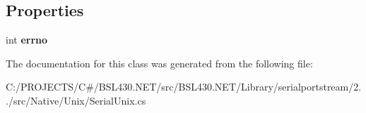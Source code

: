 \subsection*{Properties}
\begin{DoxyCompactItemize}
\item 
\mbox{\label{class_r_j_c_p_1_1_i_o_1_1_ports_1_1_native_1_1_unix_1_1_serial_unix_a579af7009aa1f1f31082a5bf8baaffbb}} 
int {\bfseries errno}
\end{DoxyCompactItemize}


The documentation for this class was generated from the following file\+:\begin{DoxyCompactItemize}
\item 
C\+:/\+P\+R\+O\+J\+E\+C\+T\+S/\+C\#/\+B\+S\+L430.\+N\+E\+T/src/\+B\+S\+L430.\+N\+E\+T/\+Library/serialportstream/2../src/\+Native/\+Unix/Serial\+Unix.\+cs\end{DoxyCompactItemize}
